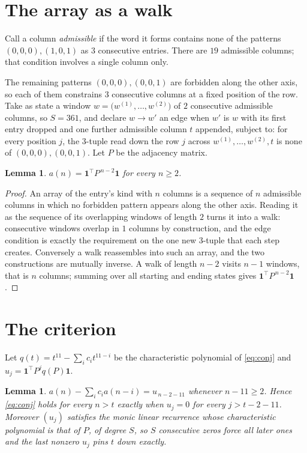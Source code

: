 \documentclass[11pt,a4paper]{article}
\theoremstyle{plain}
\newtheorem{lemma}[theorem]{Lemma}
\theoremstyle{definition}
\begin{document}
\section{The array as a walk}

Call a column \emph{admissible} if the word it forms contains none of the patterns
$(0,0,0), (1,0,1)$ as $3$ consecutive entries. There are $19$ admissible columns; that condition
involves a single column only.

The remaining patterns $(0,0,0), (0,0,1)$ are forbidden along the other axis, so each of them
constrains $3$ consecutive columns at a fixed position of the row. Take as state a
window $w=\bigl(w^{(1)},\dots,w^{(2)}\bigr)$ of $2$ consecutive admissible
columns, so $S=361$, and declare $w\to w'$ an edge when $w'$ is $w$ with its first entry
dropped and one further admissible column $t$ appended, subject to: for every position
$j$, the $3$-tuple read down the row $j$ across $w^{(1)},\dots,w^{(2)},t$
is none of $(0,0,0), (0,0,1)$. Let $P$ be the adjacency matrix.

\begin{lemma}\label{lem:walk}
$a(n)=\mathbf{1}^{\!\top}P^{\,n-2}\mathbf{1}$ for every $n\ge2$.
\end{lemma}

\begin{proof}
An array of the entry's kind with $n$ columns is a sequence of $n$ admissible columns in
which no forbidden pattern appears along the other axis. Reading it as the sequence of its
overlapping windows of length $2$ turns it into a walk: consecutive windows overlap in
$1$ columns by construction, and the edge condition is exactly the requirement on the one
new $3$-tuple that each step creates. Conversely a walk reassembles into such an array,
and the two constructions are mutually inverse. A walk of length $n-2$ visits $n-1$
windows, that is $n$ columns; summing over all starting and ending states gives
$\mathbf{1}^{\!\top}P^{\,n-2}\mathbf{1}$.
\end{proof}

\section{The criterion}

Let $q(t)=t^{11}-\sum_i c_i t^{11-i}$ be the characteristic polynomial of
\eqref{eq:conj} and $u_j=\mathbf{1}^{\!\top}P^{j}q(P)\mathbf{1}$.

\begin{lemma}\label{lem:crit}
$a(n)-\sum_i c_i a(n-i)=u_{\,n-2-11}$ whenever $n-11\ge2$. Hence
\eqref{eq:conj} holds for every $n>t$ exactly when $u_j=0$ for every
$j>t-2-11$. Moreover $(u_j)$ satisfies the monic linear recurrence whose
characteristic polynomial is that of $P$, of degree $S$, so $S$ consecutive zeros force all
later ones and the last nonzero $u_j$ pins $t$ down exactly.
\end{lemma}
\end{document}
